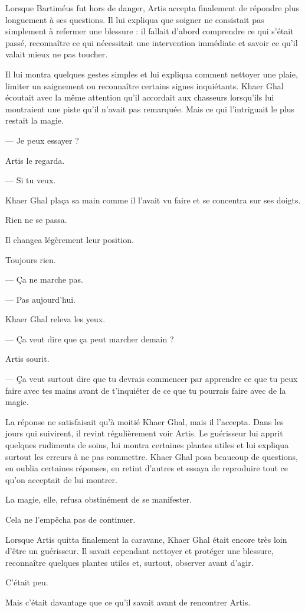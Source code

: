 
Lorsque Bartiméus fut hors de danger, Artis accepta finalement de répondre plus
longuement à ses questions. Il lui expliqua que soigner ne consistait pas
simplement à refermer une blessure : il fallait d'abord comprendre ce qui
s'était passé, reconnaître ce qui nécessitait une intervention immédiate et
savoir ce qu'il valait mieux ne pas toucher.

Il lui montra quelques gestes simples et lui expliqua comment nettoyer une
plaie, limiter un saignement ou reconnaître certains signes inquiétants. Khaer
Ghal écoutait avec la même attention qu'il accordait aux chasseurs lorsqu'ils
lui montraient une piste qu'il n'avait pas remarquée. Mais ce qui l'intriguait
le plus restait la magie.

— Je peux essayer ?

Artis le regarda.

— Si tu veux.

Khaer Ghal plaça sa main comme il l'avait vu faire et se concentra sur ses
doigts.

Rien ne se passa.

Il changea légèrement leur position.

Toujours rien.

— Ça ne marche pas.

— Pas aujourd'hui.

Khaer Ghal releva les yeux.

— Ça veut dire que ça peut marcher demain ?

Artis sourit.

— Ça veut surtout dire que tu devrais commencer par apprendre ce que tu peux
faire avec tes mains avant de t'inquiéter de ce que tu pourrais faire avec de
la magie.

La réponse ne satisfaisait qu'à moitié Khaer Ghal, mais il l'accepta. Dans les
jours qui suivirent, il revint régulièrement voir Artis. Le guérisseur lui
apprit quelques rudiments de soins, lui montra certaines plantes utiles et lui
expliqua surtout les erreurs à ne pas commettre. Khaer Ghal posa beaucoup de
questions, en oublia certaines réponses, en retint d'autres et essaya de
reproduire tout ce qu'on acceptait de lui montrer.

La magie, elle, refusa obstinément de se manifester.

Cela ne l'empêcha pas de continuer.

Lorsque Artis quitta finalement la caravane, Khaer Ghal était encore très loin
d'être un guérisseur. Il savait cependant nettoyer et protéger une blessure,
reconnaître quelques plantes utiles et, surtout, observer avant d'agir.

C'était peu.

Mais c'était davantage que ce qu'il savait avant de rencontrer Artis.